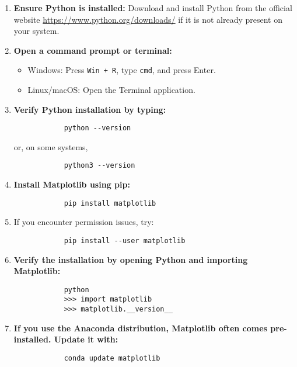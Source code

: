 \begin{enumerate}
	\item \textbf{Ensure Python is installed:} Download and install Python from the official website \url{https://www.python.org/downloads/} if it is not already present on your system.
	
	\item \textbf{Open a command prompt or terminal:}  
	\begin{itemize}
		\item Windows: Press \texttt{Win + R}, type \texttt{cmd}, and press Enter.
		\item Linux/macOS: Open the Terminal application.
	\end{itemize}
	
	\item \textbf{Verify Python installation by typing:}
	\begin{framed}
		\begin{verbatim}
			python --version
		\end{verbatim}
	\end{framed}
	or, on some systems,
	\begin{framed}
		\begin{verbatim}
			python3 --version
		\end{verbatim}
	\end{framed}
	
	\item \textbf{Install Matplotlib using pip:}
	\begin{framed}
		\begin{verbatim}
			pip install matplotlib
		\end{verbatim}
	\end{framed}
	
	\item If you encounter permission issues, try:
	\begin{framed}
		\begin{verbatim}
			pip install --user matplotlib
		\end{verbatim}
	\end{framed}
	
	\item \textbf{Verify the installation by opening Python and importing Matplotlib:}
	\begin{framed}
		\begin{verbatim}
			python
			>>> import matplotlib
			>>> matplotlib.__version__
		\end{verbatim}
	\end{framed}
	
	\item \textbf{If you use the Anaconda distribution, Matplotlib often comes pre-installed. Update it with:}
	\begin{framed}
		\begin{verbatim}
			conda update matplotlib
		\end{verbatim}
	\end{framed}
\end{enumerate}

